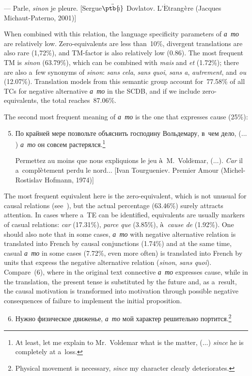 \begin{multicols}{2}
\begin{enumerate}[(1)]
--- Parle, \textit{sinon} je pleure. [\mbox{Sergue{$\ddot{\mbox{\ptb{\!\i}}}$}} Dovlatov. 
L'$\acute{\mbox{E}}$trang$\Grave{\mbox{e}}$re (Jacques Michaut-Paterno, 
2001)]
  \end{enumerate}

  When combined with this relation, the language specificity parameters of 
\textit{а~то} are relatively low. Zero-equivalents are less than~10\%, divergent 
translations are also rare (1,72\%), and TM-factor is also relatively low (0.86). The most 
frequent TM is \textit{sinon} (63.79\%), which can be combined with 
\textit{mais} and \textit{et} (1.72\%); there are also a~few synonyms of \textit{sinon}: 
\textit{sans cela}, \textit{sans quoi}, \textit{sans {}a}, \textit{autrement}, 
and \textit{ou} (12.07\%). Translation models from this semantic group account 
for~77.58\% of all TCs for negative alternative \textit{а~то} in the SCDB, and if we 
include zero-equivalents, the total reaches~87.06\%. 
  
  The second most frequent meaning of \textit{а~то} is the one that expresses cause 
(25\%):
  \begin{enumerate}[(1)]
  \setcounter{enumi}{4}
\item По крайней мере позвольте объяснить господину Вольдемару, в~чем 
дело, ($\ldots$) \textit{а~то} он совсем растерялся.\footnote[2]{At least, let me explain 
to Mr.\ Voldemar what is the matter, ($\ldots$) \textit{since} he is completely at a~loss.}

Permettez au moins que nous expliquions le jeu 
$\Grave{\mbox{a}}$~M.~Vold$\acute{\mbox{e}}$mar, ($\ldots$). \textit{Car} 
il a~compl$\Grave{\mbox{e}}$tement perdu le nord$\ldots$ [Ivan Tourgueniev. 
Premier Amour (Michel-Rostislav Hofmann, 1974)]
\end{enumerate}

  The most frequent equivalent here is the zero-equivalent, which is not unusual for 
causal relations (see~\cite{11-in, 12-in}), but the actual percentage (63.46\%) surely 
attracts attention. In cases where a~TE can be identified, equivalents are usually 
markers of casual relations: \textit{car} (17.31\%), \textit{parce que} (3.85\%), 
\textit{$\Grave{\mbox{a}}$~cause de} (1.92\%). One should also note that in some 
cases, \textit{а~то} with negative alternative relation is translated into French by 
causal conjunctions (1.74\%) and at the same time, casual \textit{а~то} in some 
cases (7.72\%, even more often) is translated into French by units that express the 
negative alternative relation (\textit{sinon}, \textit{sans quoi}). Compare~(6), where 
in the original text connective \textit{а~то} expresses cause, while in the translation, 
the present tense is substituted by the future and, as a~result, the causal motivation 
is transformed into motivation through possible negative consequences of failure to 
implement the initial proposition.
  \begin{enumerate}[(1)]
  \setcounter{enumi}{5}
  \item Нужно физическое движенье, \textit{а~то} мой характер решительно 
портится.\footnote[3]{Physical movement is necessary, \textit{since} my character clearly deteriorates.}
  

\end{enumerate}
\end{multicols}
